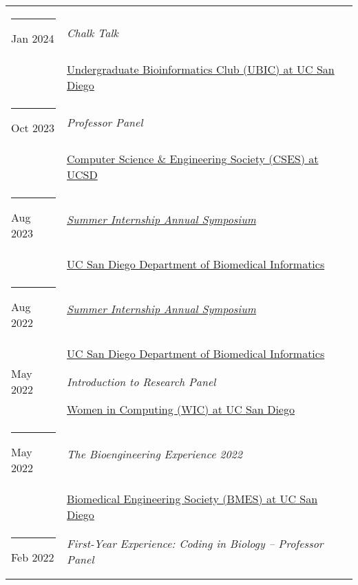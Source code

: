 \documentclass[margin,line]{res}
\begin{document}
\begin{resume}
\begin{longtable}{@{}p{0.7in}p{4in}}
\hspace*{-4mm} \rule{-1mm}{5mm} Jan 2024 & \textit{Chalk Talk}\\*
\hspace*{-4mm} & \hspace{4mm} \href{http://ubicucsd.github.io/}{Undergraduate Bioinformatics Club (UBIC) at UC San Diego}\\
\hspace*{-4mm} \rule{-1mm}{5mm} Oct 2023 & \textit{Professor Panel}\\*
\hspace*{-4mm} & \hspace{4mm} \href{https://csesucsd.com/}{Computer Science \& Engineering Society (CSES) at UCSD}\\
\hspace*{-4mm} \rule{-1mm}{5mm} Aug 2023 & \href{https://dbmi.ucsd.edu/education/internships/index.html}{\textit{Summer Internship Annual Symposium}}\\*
\hspace*{-4mm} & \hspace{4mm} \href{https://dbmi.ucsd.edu/}{UC San Diego Department of Biomedical Informatics}\\
\hspace*{-4mm} \rule{-1mm}{5mm} Aug 2022 & \href{https://dbmi.ucsd.edu/education/internships/index.html}{\textit{Summer Internship Annual Symposium}}\\*
\hspace*{-4mm} & \hspace{4mm} \href{https://dbmi.ucsd.edu/}{UC San Diego Department of Biomedical Informatics}\\
\hspace*{-4mm} May 2022 & \textit{Introduction to Research Panel}\\*
\hspace*{-4mm} & \hspace{4mm} \href{http://wic.ucsd.edu/}{Women in Computing (WIC) at UC San Diego}\\
\hspace*{-4mm} \rule{-1mm}{5mm} May 2022 & \textit{The Bioengineering Experience 2022}\\*
\hspace*{-4mm} & \hspace{4mm} \href{http://bmes.ucsd.edu/}{Biomedical Engineering Society (BMES) at UC San Diego}\\
\hspace*{-4mm} \rule{-1mm}{5mm} Feb 2022 & \textit{First-Year Experience: Coding in Biology -- Professor Panel}\\*

\end{longtable}
\end{resume}
\end{document}
